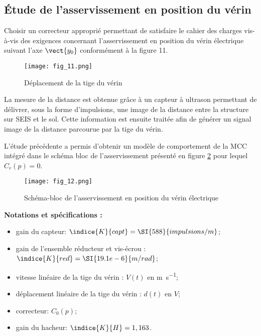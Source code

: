 \subsection{Étude de l’asservissement en position du vérin}

\begin{obj}
Choisir un correcteur approprié permettant de satisfaire le cahier des charges vis-à-vis des exigences concernant l’asservissement en position du vérin électrique suivant l’axe $\vect{y_0}$ conformément à la figure 11.
\end{obj}

\ifprof
\else

\begin{figure}[!h]
\centering
\texttt{[image: fig\_11.png]}
\caption{Déplacement de la tige du vérin\label{fig_11}}
\end{figure}

La mesure de la distance est obtenue grâce à un capteur à ultrason permettant de délivrer, sous la 
forme d’impulsions, une image de la distance entre la structure sur SEIS et le sol. Cette information 
est ensuite traitée afin de générer un signal image de la distance parcourue par la tige du vérin.

L’étude précédente a permis d’obtenir un modèle de comportement de la MCC intégré dans le schéma bloc de l’asservissement présenté en figure \ref{fig_12} pour lequel $C_r(p)=0$.

\begin{figure}[!h]
\centering
\texttt{[image: fig\_12.png]}
\caption{Schéma-bloc de l’asservissement en position du vérin électrique\label{fig_12}}
\end{figure}


\textbf{Notations et spécifications :}
\begin{multicols}{2}
\begin{itemize}
\item gain du capteur: $\indice{K}{capt} = \SI{588}{impulsions/m}$;
\item gain de l’ensemble réducteur et vis-écrou : $\indice{K}{red} = \SI{19.1e-6}{m/rad}$;
\item vitesse linéaire de la tige du vérin : $V(t)$ en \si{m.s^{-1}};
\item déplacement linéaire de la tige du vérin : $d(t)$ en $\si{V}$;
\item correcteur: $C_0(p)$;
\item gain du hacheur: $\indice{K}{H} = 1,163$.
\end{itemize}
\end{multicols}

